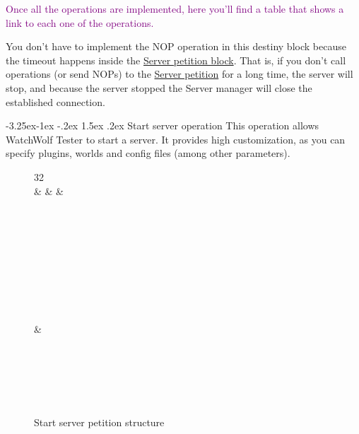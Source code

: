 \documentclass[11pt]{article}
\makeatletter
\renewcommand\subsection{\@startsection{subsection}{2}{\z@}%
                                         {-3.25ex\@plus -1ex \@minus -.2ex}%
                                         {1.5ex \@plus .2ex}%
                                         {\normalfont\fontfamily{phv}\fontsize{14}{17}\bfseries}}
\newcommand\myworries[1]{\textcolor{purple}{#1}}
\makeatother
\begin{document}
\myworries{Once all the operations are implemented, here you'll find a table that shows a link to each one of the operations.}

You don't have to implement the NOP operation in this destiny block because the timeout happens inside the \hyperref[s:server-petition]{Server petition block}. That is, if you don't call operations (or send NOPs) to the \hyperref[s:server-petition]{Server petition} for a long time, the server will stop, and because the server stopped the Server manager will close the established connection.

\subsection{Start server operation}\label{s:server-manager-start}
This operation allows WatchWolf Tester to start a server. It provides high customization, as you can specify plugins, worlds and config files (among other parameters).

\newpage
\vfill
\begin{figure}[H]
	\centering
	\begin{bytefield}{32}
		 \\
		 &  &  &  \\
		 \\
		\skippedwords \\
		 \\
		 \\
		\skippedwords \\
		 \\
		 \\
		\skippedwords \\
		 \\
		 &  \\
		 \\
		\skippedwords \\
		 \\
		 \\
		\skippedwords \\
	\end{bytefield}
	\caption{Start server petition structure}
\end{figure}
\vfill
\clearpage
\end{document}
